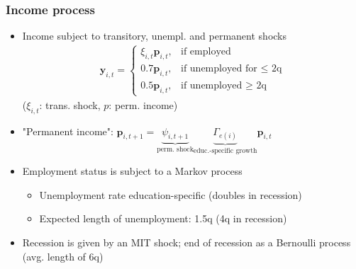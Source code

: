 \documentclass[pdflatex,aspectratio=169]{beamer}
\begin{document}
    \begin{frame}
      \frametitle{ Income process}

      \begin{itemize}[<+->]

      \item Income subject to transitory, unempl. and permanent shocks
        \begin{align}
          \mathbf{y}_{i,t} =   \begin{cases}
            \xi_{i,t}\mathbf{p}_{i,t}, & \text{if employed} \\
            0.7 \mathbf{p}_{i,t}, & \text{if unemployed for $\leq$ 2q} \\
            0.5 \mathbf{p}_{i,t}, & \text{if unemployed $\ge$ 2q} 
          \end{cases}
        \end{align}
        ($\xi_{i,t}$: trans. shock, $p$: perm. income)
        
      \item "Permanent income":  $\mathbf{p}_{i,t+1} = \underbrace{\psi_{i,t+1}}_{\text{perm. shock}} \underbrace{\Gamma_{e(i)}}_{\text{educ.-specific growth}}\mathbf{p}_{i,t}$ 


        \pause
        \bigskip
      \item Employment status is subject to a Markov process
        \begin{itemize}[<+->]
        \item Unemployment rate education-specific (doubles in recession)
        \item Expected length of unemployment: 1.5q  (4q in recession)
        \end{itemize}
        
      \item Recession is given by an MIT shock; end of recession as a Bernoulli process (avg. length of 6q)
        
        
      \end{itemize}

    \end{frame}
\end{document}
